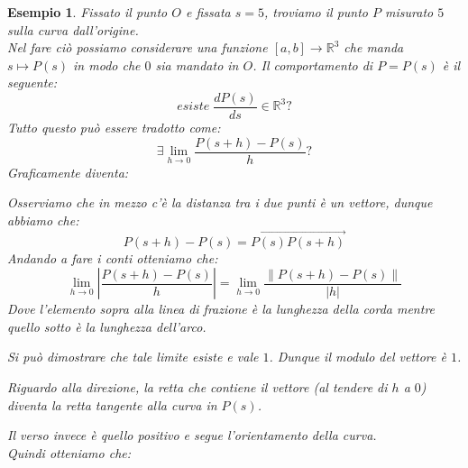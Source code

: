 \documentclass[11pt,a4paper,twoside]{article}
\newtheorem{es}{Esempio}
\theoremstyle{definition}
\begin{document}
\begin{es}
	Fissato il punto $O$ e fissata $s=5$, troviamo il punto $P$ misurato $5$ sulla curva dall'origine.\\
	Nel fare ciò possiamo considerare una funzione $[a,b] \to \mathbb R^3$ che manda $s \mapsto P(s)$ in modo che $0$ sia mandato in $O$.
	Il comportamento di $P = P(s)$ è il seguente:\[esiste\; \frac{dP(s)}{ds} \in \mathbb R^3?\]
	Tutto questo può essere tradotto come: \[\exists \lim_{h \to 0}\frac{P(s+h)-P(s)}{h}?\]
	Graficamente diventa:
	\begin{center}
	\end{center}
	Osserviamo che in mezzo c'è la distanza tra i due punti è un vettore, dunque abbiamo che:
	\[
		P(s+h) - P(s) = \overrightarrow{P(s)P(s+h)}
	\]
	Andando a fare i conti otteniamo che:
	\[
		\lim_{h \to 0} \left| \frac{P(s+h)-P(s)}{h} \right| = \lim_{h \to 0}\frac{\|P(s+h)-P(s)\|}{|h|}
	\]
	Dove l'elemento sopra alla linea di frazione è la lunghezza della corda mentre quello sotto è la lunghezza dell'arco.

	Si può dimostrare che tale limite esiste e vale $1$. Dunque il modulo del vettore è $1$.

	Riguardo alla direzione, la retta che contiene il vettore (al tendere di $h$ a $0$) diventa la retta tangente alla curva in $P(s)$.

	Il verso invece è quello positivo e segue l'orientamento della curva.\\
	Quindi otteniamo che:


\end{es}
\end{document}
